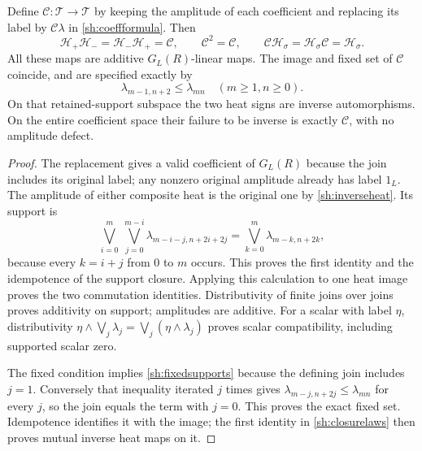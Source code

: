 \begin{theorem}
\label{sh:closure}
Define $\mathscr C:\mathscr T\to\mathscr T$ by keeping the
amplitude of each coefficient and replacing its label by
$\mathcal C\lambda$ in \eqref{sh:coeffformula}. Then
\begin{equation}\tag{SH33}\label{sh:closurelaws}
 \mathscr H_+\mathscr H_-=
 \mathscr H_-\mathscr H_+=\mathscr C,\qquad
 \mathscr C^2=\mathscr C,\qquad
 \mathscr C\mathscr H_\sigma=
 \mathscr H_\sigma\mathscr C=\mathscr H_\sigma.
\end{equation}
All these maps are additive $G_L(R)$-linear maps.
The image and fixed set of $\mathscr C$ coincide, and are
specified exactly by
\begin{equation}\tag{SH34}\label{sh:fixedsupports}
 \lambda_{m-1,n+2}\le\lambda_{mn}
       \quad(m\ge1,n\ge0).
\end{equation}
On that retained-support subspace the two heat signs are inverse
automorphisms. On the entire coefficient space their failure
to be inverse is exactly $\mathscr C$, with no amplitude defect.
\end{theorem}
\begin{proof}
The replacement gives a valid coefficient of $G_L(R)$ because
the join includes its original label; any nonzero original
amplitude already has label $1_L$. The amplitude of either
composite heat is the original one by \eqref{sh:inverseheat}.
Its support is
\[
 \bigvee_{i=0}^m\ \bigvee_{j=0}^{m-i}
       \lambda_{m-i-j,n+2i+2j}
 =\bigvee_{k=0}^m\lambda_{m-k,n+2k},
\]
because every $k=i+j$ from $0$ to $m$ occurs. This proves
the first identity and the idempotence of the support closure.
Applying this calculation to one heat image proves the two
commutation identities. Distributivity of finite joins over
joins proves additivity on support; amplitudes are additive.
For a scalar with label $\eta$, distributivity
$\eta\wedge\bigvee_j\lambda_j=
\bigvee_j(\eta\wedge\lambda_j)$ proves scalar compatibility,
including supported scalar zero.

The fixed condition implies \eqref{sh:fixedsupports} because
the defining join includes $j=1$. Conversely that inequality
iterated $j$ times gives
$\lambda_{m-j,n+2j}\le\lambda_{mn}$ for every $j$, so the
join equals the term with $j=0$. This proves the exact fixed
set. Idempotence identifies it with the image; the first
identity in \eqref{sh:closurelaws} then proves mutual inverse
heat maps on it.
\end{proof}

